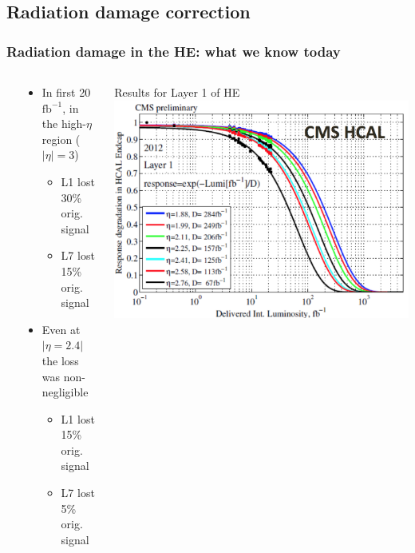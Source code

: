 \documentclass[bigger]{beamer}
\begin{document}
\subsection{Radiation damage correction}
\label{sec-2-2}
\begin{frame}
\frametitle{Radiation damage in the HE: what we know today}
\label{sec-2-2-1}
\begin{columns} %
\label{sec-2-2-1-1}
\begin{column}{0.55\textwidth}
\label{sec-2-2-1-1-1}
\begin{itemize}

\item In first 20 $\text{fb}^{-1}$, in the high-$\eta$ region ($|\eta| = 3$)
\label{sec-2-2-1-1-1-1}%
\begin{itemize}

\item L1 lost 30\% orig. signal
\label{sec-2-2-1-1-1-1-1}%

\item L7 lost 15\% orig. signal
\label{sec-2-2-1-1-1-1-2}%
\end{itemize} %

\item Even at $|\eta = 2.4|$ the loss was non-negligible
\label{sec-2-2-1-1-1-2}%
\begin{itemize}

\item L1 lost 15\% orig. signal
\label{sec-2-2-1-1-1-2-1}%

\item L7 lost  5\% orig. signal
\label{sec-2-2-1-1-1-2-2}%
\end{itemize} %
\end{itemize} %
\end{column}
\begin{column}{0.55\textwidth}
\label{sec-2-2-1-1-2}

\centering
Results for Layer 1 of HE
\includegraphics[width=\textwidth]{fig/radHE.png}
\end{column}
\end{columns}
\begin{itemize}


\end{itemize}
\end{frame}
\end{document}
